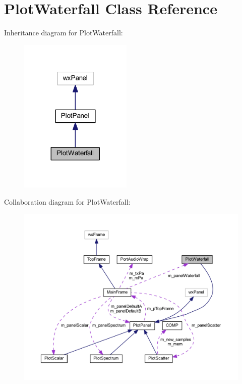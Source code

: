 \hypertarget{class_plot_waterfall}{\section{Plot\-Waterfall Class Reference}
\label{class_plot_waterfall}
}


Inheritance diagram for Plot\-Waterfall\-:
\nopagebreak
\begin{figure}[H]
\begin{center}
\leavevmode
\includegraphics[width=152pt]{class_plot_waterfall__inherit__graph}
\end{center}
\end{figure}


Collaboration diagram for Plot\-Waterfall\-:
\nopagebreak
\begin{figure}[H]
\begin{center}
\leavevmode
\includegraphics[width=350pt]{class_plot_waterfall__coll__graph}
\end{center}
\end{figure}
